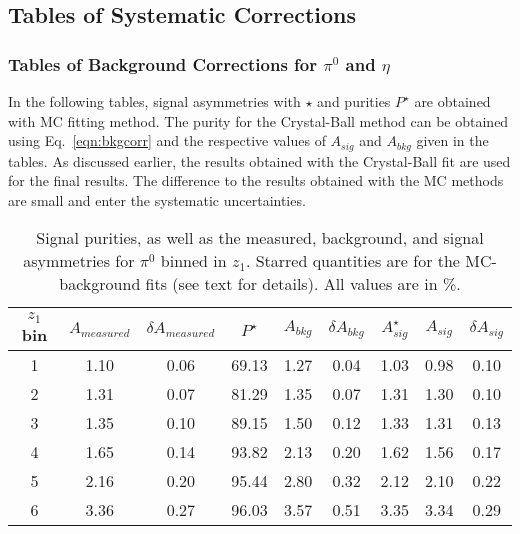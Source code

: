 \subsection{Tables of Systematic Corrections}
\subsubsection{\texorpdfstring{Tables of Background Corrections for $\pi^0$ and $\eta$}{Tables of Background Correction for pi0 and eta}}

In the following tables, signal asymmetries with $\star$ and purities $P^{\star}$ are obtained with MC fitting method. The purity for the Crystal-Ball method can be obtained using Eq.~\eqref{eqn:bkgcorr} and the respective values of $ A_{sig}$ and  $A_{bkg}$ given in the tables. As discussed earlier, the results obtained with the Crystal-Ball fit are used for the final results. The difference to the results obtained with the MC methods are small and enter the systematic uncertainties.
\begin{table}[H]\footnotesize
\centering
\begin{tabular}{|c|c|c|c|c|c|c|c|c|}
\hline
$z_1$ bin & $A_{measured}$ & $\delta A_{measured}$ & $P^{\star}$ & $A_{bkg}$ & $\delta A_{bkg}$ & $A_{sig}^{\star}$ & $ A_{sig}$  & $\delta A_{sig}$ \\ \hline\hline
1 & 1.10 & 0.06 & 69.13 & 1.27 & 0.04 & 1.03 & 0.98 & 0.10 \\ \hline 
2 & 1.31 & 0.07 & 81.29 & 1.35 & 0.07 & 1.31 & 1.30 & 0.10 \\ \hline 
3 & 1.35 & 0.10 & 89.15 & 1.50 & 0.12 & 1.33 & 1.31 & 0.13 \\ \hline 
4 & 1.65 & 0.14 & 93.82 & 2.13 & 0.20 & 1.62 & 1.56 & 0.17 \\ \hline 
5 & 2.16 & 0.20 & 95.44 & 2.80 & 0.32 & 2.12 & 2.10 & 0.22 \\ \hline 
6 & 3.36 & 0.27 & 96.03 & 3.57 & 0.51 & 3.35 & 3.34 & 0.29 \\ \hline 
\end{tabular}
\caption[BG-correction quantities for $\pi^0$ asymmetries, $z_1$ bins]{Signal purities, as well as the measured, background, and signal asymmetries for $\pi^0$ binned in $z_1$. Starred quantities are for the MC-background fits (see text for details). All values are in \%.}
\label{tab:sinzbkgcor}
\end{table}

